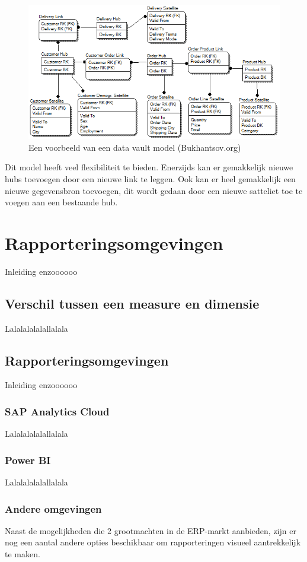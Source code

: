 \begin{figure}[h]
	\centering
	\includegraphics[scale=0.7]{../images/dvmodel.png}
	\caption{Een voorbeeld van een data vault model (Bukhantsov.org)}
	\label{fig:dvmod}
\end{figure}

Dit model heeft veel flexibiliteit te bieden. Enerzijds kan er gemakkelijk nieuwe hubs toevoegen door een nieuwe link te leggen. Ook kan er heel gemakkelijk een nieuwe gegevensbron toevoegen, dit wordt gedaan door een nieuwe satteliet toe te voegen aan een bestaande hub. 

\section{Rapporteringsomgevingen}
Inleiding enzoooooo

\subsection{Verschil tussen een measure en dimensie}
Lalalalalalallalala

\subsection{Rapporteringsomgevingen}
\label{sec:omgeving}
Inleiding enzoooooo

\subsubsection{SAP Analytics Cloud}
Lalalalalalallalala

\subsubsection{Power BI}
Lalalalalalallalala

\subsubsection{Andere omgevingen}
Naast de mogelijkheden die 2 grootmachten in de ERP-markt aanbieden, zijn er nog een aantal andere opties beschikbaar om rapporteringen visueel aantrekkelijk te maken. 





